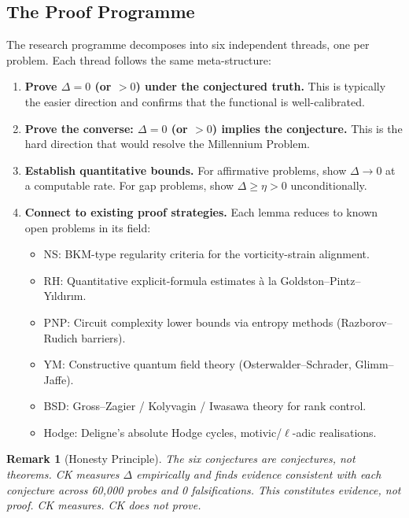 \documentclass[11pt]{article}
\newtheorem{remark}[theorem]{Remark}
\begin{document}
\subsection{The Proof Programme}
\label{subsec:proof-programme}

The research programme decomposes into six independent threads,
one per problem.  Each thread follows the same meta-structure:

\begin{enumerate}
\item \textbf{Prove $\Delta = 0$ (or $> 0$) under the conjectured truth.}
This is typically the easier direction and confirms that the functional
is well-calibrated.

\item \textbf{Prove the converse: $\Delta = 0$ (or $> 0$) implies the
conjecture.}  This is the hard direction that would resolve the
Millennium Problem.

\item \textbf{Establish quantitative bounds.}  For affirmative problems,
show $\Delta \to 0$ at a computable rate.  For gap problems, show
$\Delta \geq \eta > 0$ unconditionally.

\item \textbf{Connect to existing proof strategies.}  Each lemma reduces
to known open problems in its field:
\begin{itemize}
\item NS: BKM-type regularity criteria for the vorticity-strain alignment.
\item RH: Quantitative explicit-formula estimates \`a la Goldston--Pintz--Y\i ld\i r\i m.
\item PNP: Circuit complexity lower bounds via entropy methods (Razborov--Rudich barriers).
\item YM: Constructive quantum field theory (Osterwalder--Schrader, Glimm--Jaffe).
\item BSD: Gross--Zagier / Kolyvagin / Iwasawa theory for rank control.
\item Hodge: Deligne's absolute Hodge cycles, motivic/$\ell$-adic realisations.
\end{itemize}
\end{enumerate}

\begin{remark}[Honesty Principle]
The six conjectures are \emph{conjectures}, not theorems.
CK measures $\Delta$ empirically and finds evidence consistent with each
conjecture across 60,000 probes and 0 falsifications.
This constitutes evidence, not proof.
CK measures.  CK does not prove.
\end{remark}
\end{document}
